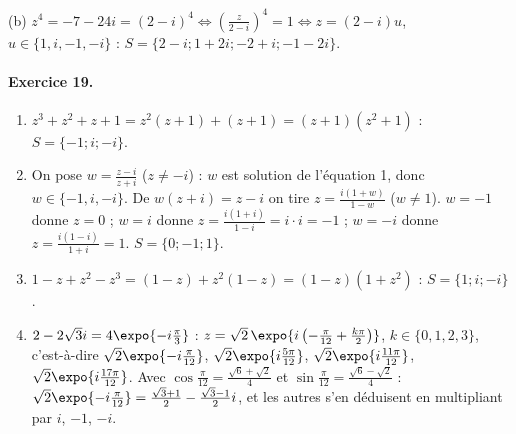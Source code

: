 \begin{corrige}
\begin{enumerate}
      (b) $z^4 = -7 - 24i = (2-i)^4 \iff \left(\frac{z}{2-i}\right)^4 = 1 \iff z = (2-i)u$, $u \in \{1, i, -1, -i\}$ :
      $S = \{2 - i ; 1 + 2i ; -2 + i ; -1 - 2i\}$.
\end{enumerate}

\paragraph{Exercice 19.}
\begin{enumerate}
\item $z^3 + z^2 + z + 1 = z^2(z+1) + (z+1) = (z+1)(z^2+1)$ : $S = \{-1 ; i ; -i\}$.
\item On pose $w = \frac{z-i}{z+i}$ ($z \neq -i$) : $w$ est solution de l'\'equation 1, donc $w \in \{-1, i, -i\}$.
      De $w(z + i) = z - i$ on tire $z = \frac{i(1+w)}{1-w}$ ($w \neq 1$).
      $w = -1$ donne $z = 0$ ; $w = i$ donne $z = \frac{i(1+i)}{1-i} = i \cdot i = -1$ ; $w = -i$ donne $z = \frac{i(1-i)}{1+i} = 1$.
      $S = \{0 ; -1 ; 1\}$.
\item $1 - z + z^2 - z^3 = (1 - z) + z^2(1 - z) = (1-z)(1+z^2)$ : $S = \{1 ; i ; -i\}$.
\item $2 - 2\sqrt{3}i = 4\expo{-i\frac{\pi}{3}}$ : $z = \sqrt{2}\,\expo{i\left(-\frac{\pi}{12} + \frac{k\pi}{2}\right)}$, $k \in \{0,1,2,3\}$,
      c'est-\`a-dire $\sqrt{2}\expo{-i\frac{\pi}{12}}$, $\sqrt{2}\expo{i\frac{5\pi}{12}}$, $\sqrt{2}\expo{i\frac{11\pi}{12}}$, $\sqrt{2}\expo{i\frac{17\pi}{12}}$.
      Avec $\cos\frac{\pi}{12} = \frac{\sqrt{6}+\sqrt{2}}{4}$ et $\sin\frac{\pi}{12} = \frac{\sqrt{6}-\sqrt{2}}{4}$ :
      $\sqrt{2}\expo{-i\frac{\pi}{12}} = \frac{\sqrt{3}+1}{2} - \frac{\sqrt{3}-1}{2}i$, et les autres s'en d\'eduisent en multipliant par $i$, $-1$, $-i$.
\end{enumerate}


\end{corrige}
